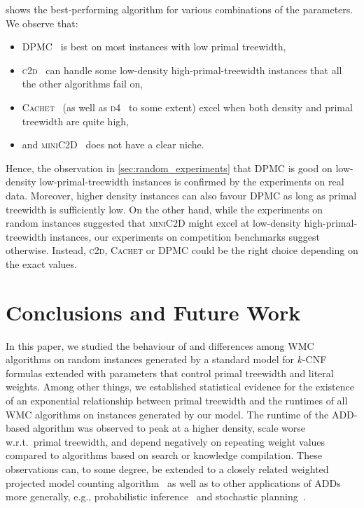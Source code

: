 \documentclass[runningheads]{llncs}
\begin{document}
 shows the best-performing algorithm for various combinations of
the parameters. We observe that:
\begin{itemize}
  \item \textsc{DPMC}~\cite{DBLP:conf/cp/DudekPV20} is best on most instances
        with low primal treewidth,
  \item \textsc{c2d}~\cite{DBLP:conf/ecai/Darwiche04} can handle some
        low-density high-primal-treewidth instances that all the other
        algorithms fail on,
  \item \textsc{Cachet}~\cite{DBLP:conf/sat/SangBBKP04} (as well as
        \textsc{d4}~\cite{DBLP:conf/ijcai/LagniezM17} to some extent) excel when
        both density and primal treewidth are quite high,
  \item and \textsc{miniC2D}~\cite{DBLP:conf/ijcai/OztokD15} does not have a
        clear niche.
\end{itemize}
Hence, the observation in \cref{sec:random_experiments} that \textsc{DPMC} is
good on low-density low-primal-treewidth instances is confirmed by the
experiments on real data. Moreover, higher density instances can also favour
\textsc{DPMC} as long as primal treewidth is sufficiently low. On the other
hand, while the experiments on random instances suggested that \textsc{miniC2D}
might excel at low-density high-primal-treewidth instances, our experiments on
competition benchmarks suggest otherwise. Instead, \textsc{c2d}, \textsc{Cachet}
or \textsc{DPMC} could be the right choice depending on the exact values.

\section{Conclusions and Future Work}

In this paper, we studied the behaviour of and differences among \textsf{WMC}
algorithms on random instances generated by a standard model for $k$-CNF
formulas extended with parameters that control primal treewidth and literal
weights. Among other things, we established statistical evidence for the
existence of an exponential relationship between primal treewidth and the
runtimes of all \textsf{WMC} algorithms on instances generated by our model. The
runtime of the ADD-based algorithm was observed to peak at a higher density,
scale worse w.r.t.\ primal treewidth, and depend negatively on repeating weight
values compared to algorithms based on search or knowledge compilation. These
observations can, to some degree, be extended to a closely related weighted
projected model counting algorithm~\cite{DBLP:conf/sat/DudekPV21} as well as to
other applications of ADDs more generally, e.g., probabilistic
inference~\cite{DBLP:conf/ijcai/ChaviraD07,DBLP:conf/uai/GogateD11} and
stochastic planning~\cite{DBLP:conf/uai/HoeySHB99}.
\end{document}
